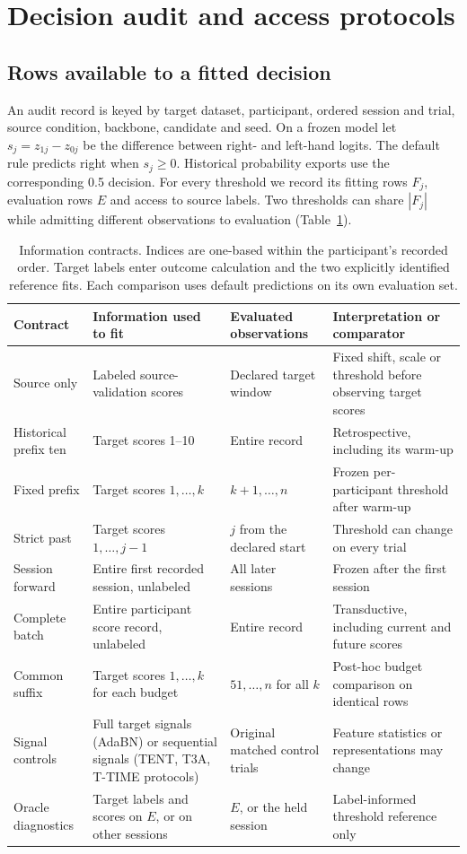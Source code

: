\section{Decision audit and access protocols}\label{sec:method}
\subsection{Rows available to a fitted decision}
An audit record is keyed by target dataset, participant, ordered session and trial, source condition, backbone, candidate and seed. On a frozen model let $s_j=z_{1j}-z_{0j}$ be the difference between right- and left-hand logits. The default rule predicts right when $s_j\geq0$. Historical probability exports use the corresponding 0.5 decision. For every threshold we record its fitting rows $F_j$, evaluation rows $E$ and access to source labels. Two thresholds can share $|F_j|$ while admitting different observations to evaluation (Table~\ref{tab:contracts}).

\begin{table}[t]
\caption{Information contracts. Indices are one-based within the participant's recorded order. Target labels enter outcome calculation and the two explicitly identified reference fits. Each comparison uses default predictions on its own evaluation set.}\label{tab:contracts}
\centering\small
\begin{tabular}{@{}p{}p{}p{}p{}@{}}\toprule
Contract & Information used to fit & Evaluated observations & Interpretation or comparator\\\midrule
Source only & Labeled source-validation scores & Declared target window & Fixed shift, scale or threshold before observing target scores\\
Historical prefix ten & Target scores 1--10 & Entire record & Retrospective, including its warm-up\\
Fixed prefix & Target scores $1,\ldots,k$ & $k+1,\ldots,n$ & Frozen per-participant threshold after warm-up\\
Strict past & Target scores $1,\ldots,j-1$ & $j$ from the declared start & Threshold can change on every trial\\
Session forward & Entire first recorded session, unlabeled & All later sessions & Frozen after the first session\\
Complete batch & Entire participant score record, unlabeled & Entire record & Transductive, including current and future scores\\
Common suffix & Target scores $1,\ldots,k$ for each budget & $51,\ldots,n$ for all $k$ & Post-hoc budget comparison on identical rows\\
Signal controls & Full target signals (AdaBN) or sequential signals (TENT, T3A, T-TIME protocols) & Original matched control trials & Feature statistics or representations may change\\
Oracle diagnostics & Target labels and scores on $E$, or on other sessions & $E$, or the held session & Label-informed threshold reference only\\\bottomrule
\end{tabular}
\end{table}

